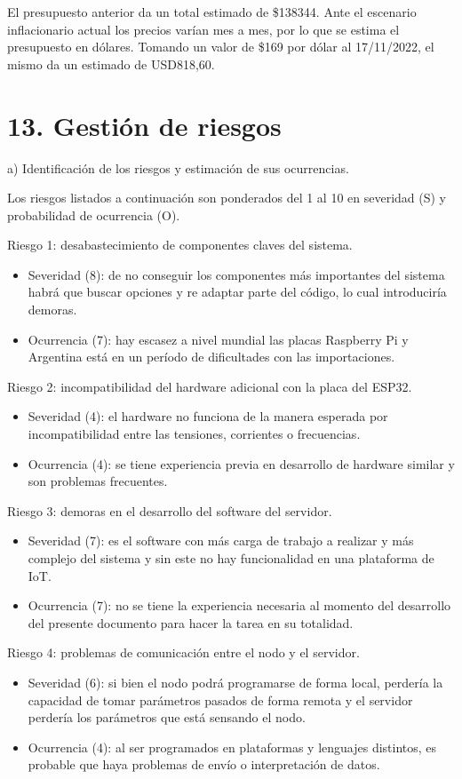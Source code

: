\documentclass[
11pt, %
]{charter}
\begin{document}
El presupuesto anterior da un total estimado de \$138344. Ante el escenario inflacionario actual los precios varían mes a mes, por lo que se estima el presupuesto en dólares. Tomando un valor de \$169 por dólar al 17/11/2022, el mismo da un estimado de USD818,60.

\section{13. Gestión de riesgos}
\label{sec:riesgos}

a) Identificación de los riesgos y estimación de sus ocurrencias.

Los riesgos listados a continuación son ponderados del 1 al 10 en severidad (S) y probabilidad de ocurrencia (O).
 
Riesgo 1: desabastecimiento de componentes claves del sistema.
\begin{itemize}
	\item Severidad (8): de no conseguir los componentes más importantes del sistema habrá que buscar opciones y re adaptar parte del código, lo cual introduciría demoras.
	\item Ocurrencia (7): hay escasez a nivel mundial las placas Raspberry Pi y Argentina está en un período de dificultades con las importaciones.
\end{itemize}   

Riesgo 2: incompatibilidad del hardware adicional con la placa del ESP32.
\begin{itemize}
	\item Severidad (4): el hardware no funciona de la manera esperada por incompatibilidad entre las tensiones, corrientes o frecuencias.
	\item Ocurrencia (4): se tiene experiencia previa en desarrollo de hardware similar y son problemas frecuentes.
\end{itemize}

Riesgo 3: demoras en el desarrollo del software del servidor.
\begin{itemize}
	\item Severidad (7): es el software con más carga de trabajo a realizar y más complejo del sistema y sin este no hay funcionalidad en una plataforma de IoT.
	\item Ocurrencia (7): no se tiene la experiencia necesaria al momento del desarrollo del presente documento para hacer la tarea en su totalidad.
\end{itemize}

Riesgo 4: problemas de comunicación entre el nodo y el servidor.
\begin{itemize}
	\item Severidad (6): si bien el nodo podrá programarse de forma local, perdería la capacidad de tomar parámetros pasados de forma remota y el servidor perdería los parámetros que está sensando el nodo.
	\item Ocurrencia (4): al ser programados en plataformas y lenguajes distintos, es probable que haya problemas de envío o interpretación de datos.
\end{itemize}
\end{document}
